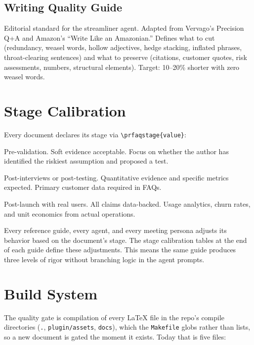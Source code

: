 \documentclass[11pt,letterpaper]{article}
\begin{document}
\subsection{Writing Quality Guide}

\begin{description}[style=nextline, leftmargin=2em]
  \item[\texttt{precise-writing.md}]
    Editorial standard for the streamliner agent. Adapted from Vervago's
    Precision Q+A and Amazon's ``Write Like an Amazonian.'' Defines what to cut
    (redundancy, weasel words, hollow adjectives, hedge stacking, inflated
    phrases, throat-clearing sentences) and what to preserve (citations, customer
    quotes, risk assessments, numbers, structural elements). Target: 10--20\%
    shorter with zero weasel words.
\end{description}

\section{Stage Calibration}

Every document declares its stage via \texttt{\textbackslash prfaqstage\{value\}}:

\begin{description}[nosep, leftmargin=2em]
  \item[hypothesis] Pre-validation. Soft evidence acceptable. Focus on whether
    the author has identified the riskiest assumption and proposed a test.
  \item[validated] Post-interviews or post-testing. Quantitative evidence and
    specific metrics expected. Primary customer data required in FAQs.
  \item[growth] Post-launch with real users. All claims data-backed. Usage
    analytics, churn rates, and unit economics from actual operations.
\end{description}

Every reference guide, every agent, and every meeting persona adjusts its
behavior based on the document's stage. The stage calibration tables at the end
of each guide define these adjustments. This means the same guide produces three
levels of rigor without branching logic in the agent prompts.

\section{Build System}

The quality gate is compilation of every LaTeX file in the repo's compile
directories (\texttt{.}, \texttt{plugin/assets}, \texttt{docs}), which the
\texttt{Makefile} globs rather than lists, so a new document is gated the moment
it exists. Today that is five files:
\end{document}
